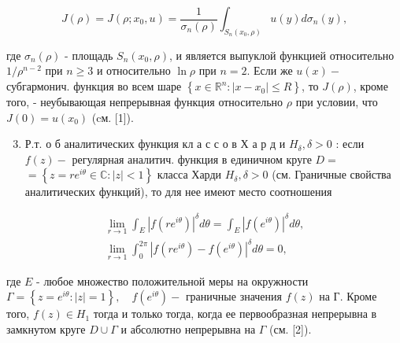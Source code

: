 \documentclass[10pt]{article}
\begin{document}
\[

J(\rho)=J\left(\rho ; x_{0}, u\right)=\frac{1}{\sigma_{n}(\rho)} \int_{S_{n}\left(x_{0}, \rho\right)} u(y) d \sigma_{n}(y),

\]



где $\sigma_{n}(\rho)$ - площадь $S_{n}\left(x_{0}, \rho\right)$, и является выпуклой функцией относительно $1 / \rho^{n-2}$ при $n \geqslant 3$ и относительно $\ln \rho$ при $n=2$. Если же $u(x)-$ субгармонич. функция во всем шаре $\left\{x \in \mathbb{R}^{n}:\left|x-x_{0}\right| \leqslant R\right\}$, то $J(\rho)$, кроме того, - неубывающая непрерывная функция относительно $\rho$ при условии, что $J(0)=u\left(x_{0}\right)$ (cм. [1]).



\begin{enumerate}

  \setcounter{enumi}{2}

  \item Р.т. о б аналитических функция кл а с с о в Х а р д и $H_{\delta}, \delta>0$ : если $f(z)-$ регулярная аналитич. функция в единичном круге $D=$ $=\left\{z=r e^{i \theta} \in \mathbb{C}:|z|<1\right\}$ класса Харди $H_{\delta}, \delta>0$ (см. Граничные свойства аналитических функций), то для нее имеют место соотношения

\end{enumerate}



\[

\begin{gathered}

\lim _{r \rightarrow 1} \int_{E}\left|f\left(r e^{i \theta}\right)\right|^{\delta} d \theta=\int_{E}\left|f\left(e^{i \theta}\right)\right|^{\delta} d \theta, \\

\lim _{r \rightarrow 1} \int_{0}^{2 \pi}\left|f\left(r e^{i \theta}\right)-f\left(e^{i \theta}\right)\right|^{\delta} d \theta=0,

\end{gathered}

\]



где $E$ - любое множество положительной меры на окружности $\Gamma=\left\{z=e^{i \theta}:|z|=1\right\}, \quad f\left(e^{i \theta}\right)-$ граничные значения $f(z)$ на $Г$. Кроме того, $f(z) \in H_{1}$ тогда и только тогда, когда ее первообразная непрерывна в замкнутом круге $D \cup \Gamma$ и абсолютно непрерывна на $\Gamma$ (см. [2]).
\end{document}
